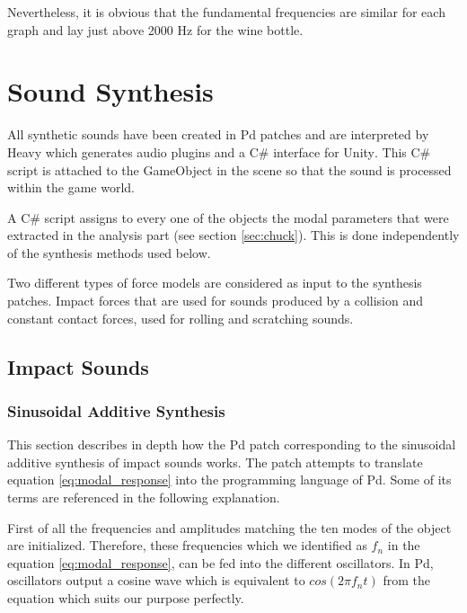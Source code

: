 Nevertheless, it is obvious that the fundamental frequencies are similar for each graph and lay just above 2000 Hz for the wine bottle.

\section{Sound Synthesis}\label{sec:synthesis_implem}

All synthetic sounds have been created in \gls{Pd} patches and are interpreted by Heavy which generates audio plugins and a C\# interface for Unity\textsuperscript{\textregistered}. This C\# script is attached to the GameObject in the scene so that the sound is processed within the game world.


A C\# script assigns to every one of the objects the modal parameters that were extracted in the analysis part (see section \ref{sec:chuck}). This is done independently of the synthesis methods used below.

Two different types of force models are considered as input to the synthesis patches. Impact forces that are used for sounds produced by a collision and constant contact forces, used for rolling and scratching sounds.

\subsection{Impact Sounds}\label{sec:impact_synth}
%
\subsubsection{Sinusoidal Additive Synthesis}\label{sec:sinusoidal_synth}

This section describes in depth how the \gls{Pd} patch corresponding to the sinusoidal additive synthesis of impact sounds works. The patch attempts to translate equation \ref{eq:modal_response} into the programming language of \gls{Pd}. Some of its terms are referenced in the following explanation.

First of all the frequencies and amplitudes matching the ten modes of the object are initialized. Therefore, these frequencies which we identified as $f_n$ in the equation \ref{eq:modal_response}, can be fed into the different oscillators. In \gls{Pd}, oscillators output a cosine wave which is equivalent to $cos(2 \pi f_nt)$ from the equation which suits our purpose perfectly.

